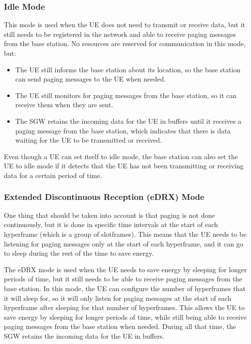 \subsubsection{Idle Mode}
This mode is used when the UE does not need to transmit or receive data, but it still needs to be registered in the network and able to receive paging messages from the base station. No resources are reserved for communication in this mode, but:
\begin{itemize}
    \item The UE still informs the base station about its location, so the base station can send paging messages to the UE when needed.
    \item The UE still monitors for paging messages from the base station, so it can receive them when they are sent.
    \item The SGW retains the incoming data for the UE in buffers until it receives a paging message from the base station, which indicates that there is data waiting for the UE to be transmitted or received.
\end{itemize}

Even though a UE can set itself to idle mode, the base station can also set the UE to idle mode if it detects that the UE has not been transmitting or receiving data for a certain period of time.

\subsubsection{Extended Discontinuous Reception (eDRX) Mode}

One thing that should be taken into account is that paging is not done continuously, but it is done in specific time intervals at the start of each hyperframe (which is a group of slotframes). This means that the UE needs to be listening for paging messages only at the start of each hyperframe, and it can go to sleep during the rest of the time to save energy.

The eDRX mode is used when the UE needs to save energy by sleeping for longer periods of time, but it still needs to be able to receive paging messages from the base station. In this mode, the UE can configure the number of hyperframes that it will sleep for, so it will only listen for paging messages at the start of each hyperframe after sleeping for that number of hyperframes. This allows the UE to save energy by sleeping for longer periods of time, while still being able to receive paging messages from the base station when needed. During all that time, the SGW retains the incoming data for the UE in buffers.

